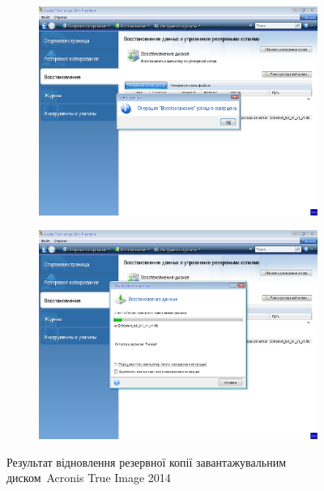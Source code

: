 \documentclass[
	a4paper,
	oneside,
	BCOR = 10mm,
	DIV = 12,
	12pt,
	headings = normal,
]{scrartcl}
\newlength{\gridunitwidth}
\begin{document}
				\begin{figure}[!htbp]
					\begin{subfigure}{5.5\gridunitwidth}
						\includegraphics[width = \columnwidth]{./assets/y03s01-pcdiag-lab-04-p05.png}
						\caption{}
						\label{subfig:03-01-acronis-true-image-disk-restore-inprocess}
					\end{subfigure}%
					\hspace{1\gridunitwidth}%
					\begin{subfigure}{5.5\gridunitwidth}
						\includegraphics[width = \columnwidth]{./assets/y03s01-pcdiag-lab-04-p06.png}
						\caption{}
						\label{subfig:02-01-acronis-true-image-disk-restore-res}
					\end{subfigure}%
					\caption{Результат відновлення резервної копії завантажувальним диском~\textenglish{Acronis True Image 2014}}
					\label{fig:03-acronis-true-image-disk-restore}
				\end{figure}
\end{document}
